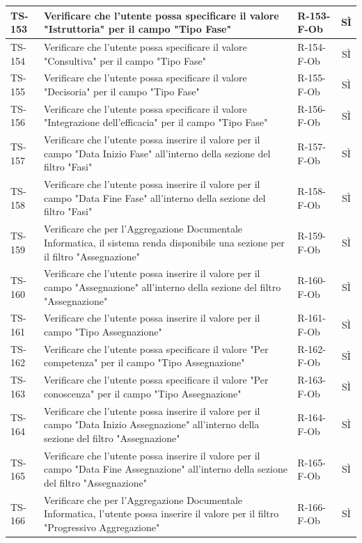 \documentclass[a4paper,12pt]{article}
\begin{document}
\begin{longtable}{|p{1.5cm}|p{8.3cm}|p{2.4cm}|c|}
\hline
TS-153 & Verificare che l'utente possa specificare il valore "Istruttoria" per il campo "Tipo Fase" & R-153-F-Ob & SÌ \\
\hline
TS-154 & Verificare che l'utente possa specificare il valore "Consultiva" per il campo "Tipo Fase" & R-154-F-Ob & SÌ \\
\hline
TS-155 & Verificare che l'utente possa specificare il valore "Decisoria" per il campo "Tipo Fase" & R-155-F-Ob & SÌ \\
\hline
TS-156 & Verificare che l'utente possa specificare il valore "Integrazione dell'efficacia" per il campo "Tipo Fase" & R-156-F-Ob & SÌ \\
\hline
TS-157 & Verificare che l'utente possa inserire il valore per il campo "Data Inizio Fase" all'interno della sezione del filtro "Fasi" & R-157-F-Ob & SÌ \\
\hline
TS-158 & Verificare che l'utente possa inserire il valore per il campo "Data Fine Fase" all'interno della sezione del filtro "Fasi" & R-158-F-Ob & SÌ \\
\hline
TS-159 & Verificare che per l'Aggregazione Documentale Informatica, il sistema renda disponibile una sezione per il filtro "Assegnazione" & R-159-F-Ob & SÌ \\
\hline
TS-160 & Verificare che l'utente possa inserire il valore per il campo "Assegnazione" all'interno della sezione del filtro "Assegnazione" & R-160-F-Ob & SÌ \\
\hline
TS-161 & Verificare che l'utente possa inserire il valore per il campo "Tipo Assegnazione" & R-161-F-Ob & SÌ \\
\hline
TS-162 & Verificare che l'utente possa specificare il valore "Per competenza" per il campo "Tipo Assegnazione" & R-162-F-Ob & SÌ \\
\hline
TS-163 & Verificare che l'utente possa specificare il valore "Per conoscenza" per il campo "Tipo Assegnazione" & R-163-F-Ob & SÌ \\
\hline
TS-164 & Verificare che l'utente possa inserire il valore per il campo "Data Inizio Assegnazione" all'interno della sezione del filtro "Assegnazione" & R-164-F-Ob & SÌ \\
\hline
TS-165 & Verificare che l'utente possa inserire il valore per il campo "Data Fine Assegnazione" all'interno della sezione del filtro "Assegnazione" & R-165-F-Ob & SÌ \\
\hline
TS-166 & Verificare che per l'Aggregazione Documentale Informatica, l'utente possa inserire il valore per il filtro "Progressivo Aggregazione" & R-166-F-Ob & SÌ \\

\end{longtable}
\end{document}
